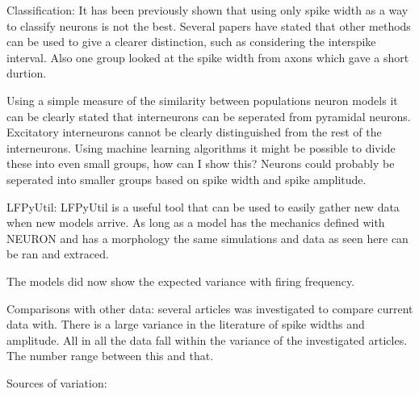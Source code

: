 \documentclass[altfont, fleqn]{uiophd}
\begin{document}
Classification:
It has been previously shown that using only spike width as 
a way to classify neurons is not the best. 
Several papers have stated that other methods can be used to give 
a clearer distinction, such as considering the interspike interval. 
Also one group looked at the spike width from axons which gave a short 
durtion. 

Using a simple measure of the similarity between populations
neuron models it can be clearly stated that interneurons can be seperated
from pyramidal neurons. 
Excitatory interneurons cannot be clearly distinguished from the rest of the
interneurons. 
Using machine learning algorithms it might be possible to divide these
into even small groups, how can I show this?
Neurons could probably be seperated into smaller groups based on
spike width and spike amplitude. 

LFPyUtil: 
LFPyUtil is a useful tool that can be used to easily gather
new data when new models arrive. 
As long as a model has the mechanics defined with NEURON and has
a morphology the same simulations and data as seen here can be ran 
and extraced.

The models did now show the expected variance with firing frequency. 

Comparisons with other data:
several articles was investigated to compare current data with.
There is a large variance in the literature of spike widths and amplitude. 
All in all the data fall within the variance of the investigated articles. 
The number range between this and that.


Sources of variation:


\end{document}
